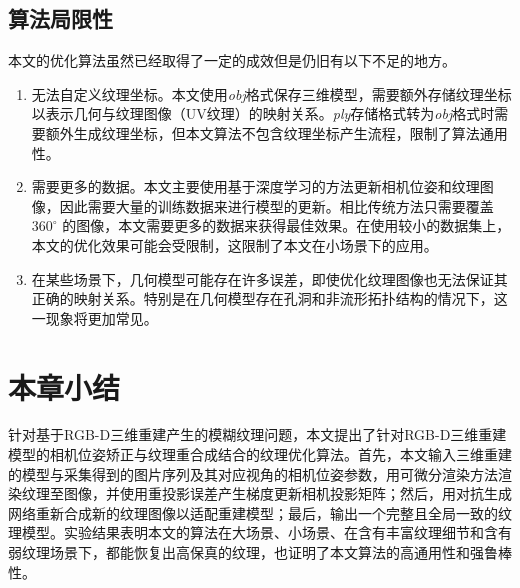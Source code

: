\subsection{算法局限性}
本文的优化算法虽然已经取得了一定的成效但是仍旧有以下不足的地方。
\begin{enumerate}[label=(\arabic*),leftmargin=\parindent,align=left,labelwidth=\parindent,labelsep=0pt]
\item 无法自定义纹理坐标。本文使用\emph{obj}格式保存三维模型，需要额外存储纹理坐标以表示几何与纹理图像（UV纹理）的映射关系。\emph{ply}存储格式转为\emph{obj}格式时需要额外生成纹理坐标，但本文算法不包含纹理坐标产生流程，限制了算法通用性。
\item 需要更多的数据。本文主要使用基于深度学习的方法更新相机位姿和纹理图像，因此需要大量的训练数据来进行模型的更新。相比传统方法只需要覆盖 $360^{\circ} $ 的图像，本文需要更多的数据来获得最佳效果。在使用较小的数据集上，本文的优化效果可能会受限制，这限制了本文在小场景下的应用。
\item 在某些场景下，几何模型可能存在许多误差，即使优化纹理图像也无法保证其正确的映射关系。特别是在几何模型存在孔洞和非流形拓扑结构的情况下，这一现象将更加常见。
\end{enumerate}





\section{本章小结}

针对基于RGB-D三维重建产生的模糊纹理问题，本文提出了针对RGB-D三维重建模型的相机位姿矫正与纹理重合成结合的纹理优化算法。首先，本文输入三维重建的模型与采集得到的图片序列及其对应视角的相机位姿参数，用可微分渲染方法渲染纹理至图像，并使用重投影误差产生梯度更新相机投影矩阵；然后，用对抗生成网络重新合成新的纹理图像以适配重建模型；最后，输出一个完整且全局一致的纹理模型。实验结果表明本文的算法在大场景、小场景、在含有丰富纹理细节和含有弱纹理场景下，都能恢复出高保真的纹理，也证明了本文算法的高通用性和强鲁棒性。




